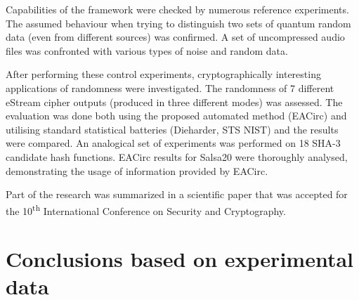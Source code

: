 \documentclass[12pt,twoside]{fithesis2}		%
\renewcommand{\_}{\leavevmode \kern0.0em\vbox{\hrule width0.4em}}
\begin{document}
Capabilities of the framework were checked by numerous reference experiments. The assumed behaviour when trying to distinguish
two sets of quantum random data (even from different sources) was confirmed. A set of uncompressed audio files was confronted with
various types of noise and random data. 

After performing these control experiments, cryptographically interesting applications of randomness were investigated.
The randomness of 7 different eStream cipher outputs (produced in three different modes) was assessed.
The evaluation was done both using the proposed automated method (EACirc) and utilising standard statistical batteries
(Dieharder, STS NIST) and the results were compared. An analogical set of experiments was performed 
on 18 SHA-3 candidate hash functions.
EACirc results for Salsa20 were thoroughly analysed, demonstrating the usage of information provided by EACirc.

Part of the research was summarized in a scientific paper that was accepted for the 10\textsuperscript{th} International Conference
on Security and Cryptography. \parencite{lab-paper}

\section{Conclusions based on experimental data}
\label{sec:outro-conclusions}
\end{document}
